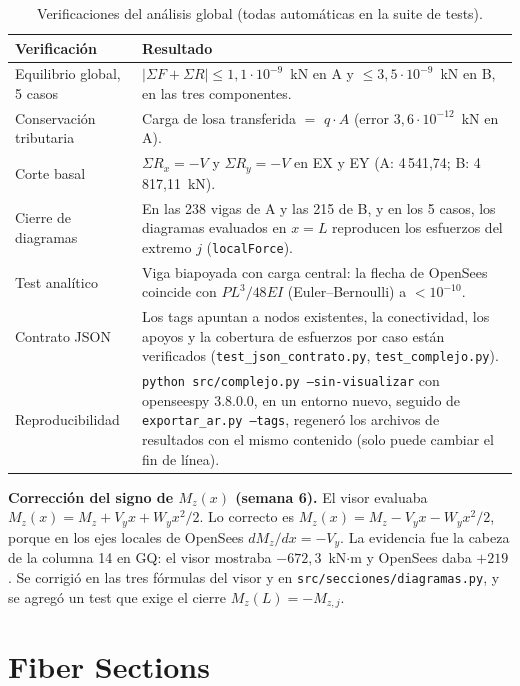 \documentclass[11pt,a4paper]{article}
\begin{document}
\begin{table}[h]
\centering
\caption{Verificaciones del análisis global (todas automáticas en la suite de tests).}
\begin{tabularx}{\textwidth}{lX}
\toprule
Verificación & Resultado \\
\midrule
Equilibrio global, 5 casos &
$|\Sigma F + \Sigma R| \le 1{,}1\cdot10^{-9}$~kN en A y $\le 3{,}5\cdot10^{-9}$~kN en B, en las tres componentes. \\
Conservación tributaria &
Carga de losa transferida $=$ $q\cdot A$ (error $3{,}6\cdot10^{-12}$~kN en A). \\
Corte basal &
$\Sigma R_x = -V$ y $\Sigma R_y = -V$ en EX y EY (A: 4\,541,74; B: 4\,817,11~kN). \\
Cierre de diagramas &
En las 238 vigas de A y las 215 de B, y en los 5 casos, los diagramas
evaluados en $x = L$ reproducen los esfuerzos del extremo $j$
(\texttt{localForce}). \\
Test analítico &
Viga biapoyada con carga central: la flecha de OpenSees coincide con
$PL^3/48EI$ (Euler--Bernoulli) a $< 10^{-10}$. \\
Contrato JSON &
Los tags apuntan a nodos existentes, la conectividad, los apoyos y la cobertura
de esfuerzos por caso están verificados (\texttt{test\_json\_contrato.py},
\texttt{test\_complejo.py}). \\
Reproducibilidad &
\texttt{python src/complejo.py --sin-visualizar} con openseespy 3.8.0.0, en un
entorno nuevo, seguido de \texttt{exportar\_ar.py --tags}, regeneró los
archivos de resultados con el mismo contenido (solo puede cambiar el fin de
línea). \\
\bottomrule
\end{tabularx}
\end{table}

\textbf{Corrección del signo de $M_z(x)$ (semana 6).} El visor evaluaba
$M_z(x) = M_z + V_y x + W_y x^2/2$. Lo correcto es
$M_z(x) = M_z - V_y x - W_y x^2/2$, porque en los ejes locales de OpenSees
$dM_z/dx = -V_y$. La evidencia fue la cabeza de la columna 14 en GQ: el visor
mostraba $-672{,}3$~kN$\cdot$m y OpenSees daba $+219$. Se corrigió en las tres
fórmulas del visor y en \texttt{src/secciones/diagramas.py}, y se agregó un test
que exige el cierre $M_z(L) = -M_{z,j}$.

\section{Fiber Sections}
\end{document}
